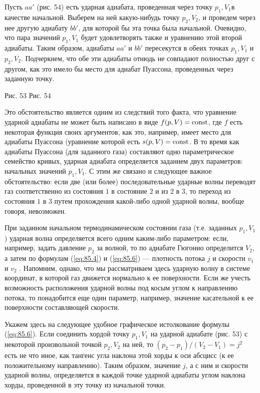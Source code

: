 Пусть $aa'$  (рис. 54) есть ударная адиабата, проведенная через точку  $p_1,
V_1$в качестве начальной. Выберем на ней какую-нибудь точку $p_2, V_2$, и
проведем через нее другую адиабату $bb'$, для которой бы эта точка была
начальной. Очевидно, что пара значений $p_1, V_1$ будет удовлетворять также и
уравнению этой второй адиабаты.  Таким образом, адиабаты $aa'$ и $bb'$
пересекутся в обеих точках $p_1, V_1$ и $p_2, V_2$.  Подчеркнем, что обе эти
адиабаты отнюдь не совпадают полностью друг с другом, как это имело бы место для
адиабат Пуассона, проведенных через заданную точку.

Рис. 53	Рис. 54

Это обстоятельство является одним из следствий того факта, что уравнение ударной
адиабаты не может быть написано в виде $f(p,V)=\mathop{\mathrm{const}}\nolimits$, где $f$ есть некоторая
функция своих аргументов, как это, например, имеет место для адиабаты Пуассона
(уравнение которой есть $s(p,V)=\mathop{\mathrm{const}}\nolimits$. В то время как адиабаты Пуассона (для
заданного газа) составляют одно параметрическое семейство кривых, ударная
адиабата определяется заданием двух параметров: начальных значений $p_1, V_1$. С
этим же связано и следующее важное обстоятельство: если две (или более)
последовательные ударные волны переводят газ соответственно из состояния  $1$ в
состояние $2$ и из $2$ в $3$, то переход из состояния $1$ в $3$ путем
прохождения какой-либо одной ударной волны, вообще говоря, невозможен.

При заданном начальном термодинамическом состоянии газа (т.е. заданных $p_1,
V_1$) ударная волна определяется всего одним каким-либо параметром: если,
например, задать давление $p_2$ за волной, то по адиабате Гюгонио определится
$V_2$, а затем по формулам (\ref{eq:85.4}) и (\ref{eq:85.6}) --- плотность
потока $j$ и скорости $v_1$ и $v_2$ . Напомним, однако, что мы рассматриваем
здесь ударную волну в системе координат, в которой газ движется нормально к ее
поверхности. Если же учесть возможность расположения ударной волны под косым
углом к направлению потока, то понадобится еще один параметр, например, значение касательной к ее поверхности составляющей скорости.

Укажем здесь на следующее удобное графическое истолкование формулы
(\ref{eq:85.6}). Если соединить хордой точку $p_1, V_1$ на ударной адиабате (рис. 53)
с некоторой произвольной точкой $p_2, V_2$ на ней, то $(p_2-p_1)/(V_2-V_1)=j^2$ есть
не что иное, как тангенс угла наклона этой хорды к оси абсцисс (к ее
положительному направлению). Таким образом, значение $j$, а с ним и скорости
ударной волны, определяется в каждой точке ударной адиабаты углом наклона хорды,
проведенной в эту точку из начальной точки.

